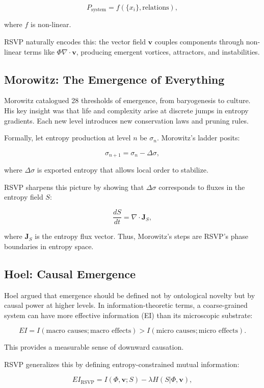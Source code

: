 \documentclass[12pt]{book}
\begin{document}
\[ P_{\text{system}} = f(\{x_i\}, \text{relations}), \]

where \( f \) is non-linear.

RSVP naturally encodes this: the vector field \( \mathbf{v} \) couples components through non-linear terms like \( \Phi \nabla \cdot \mathbf{v} \), producing emergent vortices, attractors, and instabilities.

\subsection{Morowitz: The Emergence of Everything}
Morowitz catalogued 28 thresholds of emergence, from baryogenesis to culture. His key insight was that life and complexity arise at discrete jumps in entropy gradients. Each new level introduces new conservation laws and pruning rules.

Formally, let entropy production at level \( n \) be \( \sigma_n \). Morowitz’s ladder posits:

\[ \sigma_{n+1} = \sigma_n - \Delta \sigma, \]

where \( \Delta \sigma \) is exported entropy that allows local order to stabilize.

RSVP sharpens this picture by showing that \( \Delta \sigma \) corresponds to fluxes in the entropy field \( S \):

\[ \frac{dS}{dt} = \nabla \cdot \mathbf{J}_S, \]

where \( \mathbf{J}_S \) is the entropy flux vector. Thus, Morowitz’s steps are RSVP’s phase boundaries in entropy space.

\subsection{Hoel: Causal Emergence}
Hoel argued that emergence should be defined not by ontological novelty but by causal power at higher levels. In information-theoretic terms, a coarse-grained system can have more effective information (EI) than its microscopic substrate:

\[ EI = I(\text{macro causes}; \text{macro effects}) > I(\text{micro causes}; \text{micro effects}). \]

This provides a measurable sense of downward causation.

RSVP generalizes this by defining entropy-constrained mutual information:

\[ EI_{\text{RSVP}} = I(\Phi, \mathbf{v}; S) - \lambda H(S|\Phi, \mathbf{v}), \]
\end{document}
